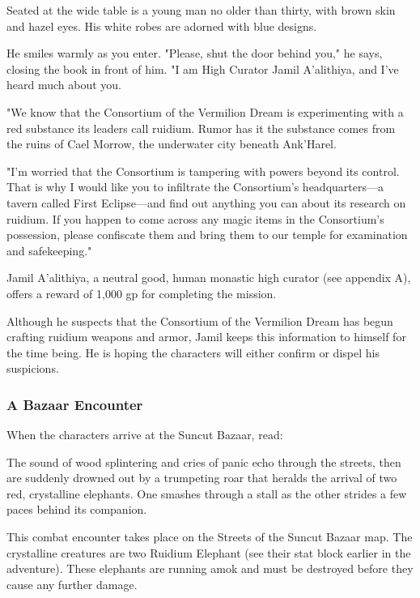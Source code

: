 \documentclass[10pt,a4paper,twoside,twocolumn,openany,nodeprecatedcode]{dndbook}
\begin{document}
\begin{DndReadAloud}{}
Seated at the wide table is a young man no older than thirty, with brown skin and hazel eyes. His white robes are adorned with blue designs.

He smiles warmly as you enter. "Please, shut the door behind you," he says, closing the book in front of him. "I am High Curator Jamil A'alithiya, and I've heard much about you.

"We know that the Consortium of the Vermilion Dream is experimenting with a red substance its leaders call ruidium. Rumor has it the substance comes from the ruins of Cael Morrow, the underwater city beneath Ank'Harel.

"I'm worried that the Consortium is tampering with powers beyond its control. That is why I would like you to infiltrate the Consortium's headquarters—a tavern called First Eclipse—and find out anything you can about its research on ruidium. If you happen to come across any magic items in the Consortium's possession, please confiscate them and bring them to our temple for examination and safekeeping."

\end{DndReadAloud}

Jamil A'alithiya, a neutral good, human monastic high curator (see appendix A), offers a reward of 1,000 gp for completing the mission.

Although he suspects that the Consortium of the Vermilion Dream has begun crafting ruidium weapons and armor, Jamil keeps this information to himself for the time being. He is hoping the characters will either confirm or dispel his suspicions.

\subsubsection{A Bazaar Encounter}
When the characters arrive at the Suncut Bazaar, read:

\begin{DndReadAloud}{}
The sound of wood splintering and cries of panic echo through the streets, then are suddenly drowned out by a trumpeting roar that heralds the arrival of two red, crystalline elephants. One smashes through a stall as the other strides a few paces behind its companion.

\end{DndReadAloud}

This combat encounter takes place on the Streets of the Suncut Bazaar map. The crystalline creatures are two Ruidium Elephant (see their stat block earlier in the adventure). These elephants are running amok and must be destroyed before they cause any further damage.
\end{document}
